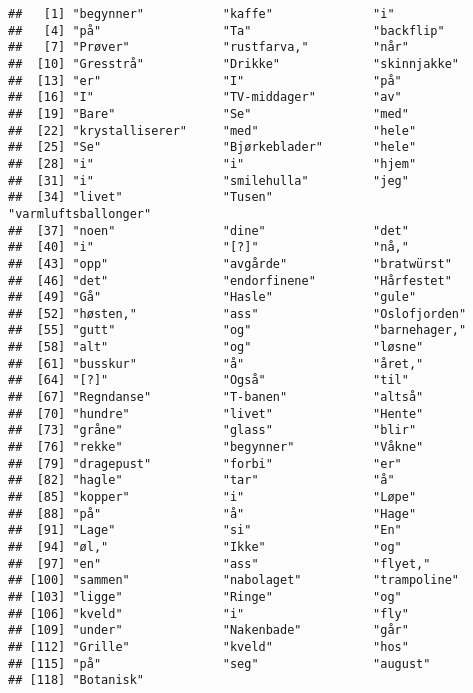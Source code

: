 \documentclass[
]{book}
\begin{document}
\begin{verbatim}
##   [1] "begynner"           "kaffe"              "i"                 
##   [4] "på"                 "Ta"                 "backflip"          
##   [7] "Prøver"             "rustfarva,"         "når"               
##  [10] "Gresstrå"           "Drikke"             "skinnjakke"        
##  [13] "er"                 "I"                  "på"                
##  [16] "I"                  "TV-middager"        "av"                
##  [19] "Bare"               "Se"                 "med"               
##  [22] "krystalliserer"     "mеd"                "hele"              
##  [25] "Se"                 "Bjørkeblader"       "hele"              
##  [28] "i"                  "i"                  "hjem"              
##  [31] "i"                  "smilehulla"         "jeg"               
##  [34] "livet"              "Tusen"              "varmluftsballonger"
##  [37] "noen"               "dine"               "det"               
##  [40] "i"                  "[?]"                "nå,"               
##  [43] "opp"                "avgårde"            "bratwürst"         
##  [46] "det"                "endorfinene"        "Hårfestet"         
##  [49] "Gå"                 "Hasle"              "gule"              
##  [52] "høsten,"            "ass"                "Oslofjorden"       
##  [55] "gutt"               "og"                 "barnehager,"       
##  [58] "alt"                "og"                 "løsne"             
##  [61] "busskur"            "å"                  "året,"             
##  [64] "[?]"                "Også"               "til"               
##  [67] "Regndanse"          "T-banen"            "altså"             
##  [70] "hundre"             "livet"              "Hente"             
##  [73] "gråne"              "glass"              "blir"              
##  [76] "rekke"              "begynner"           "Våkne"             
##  [79] "dragepust"          "forbi"              "er"                
##  [82] "hagle"              "tar"                "å"                 
##  [85] "koppеr"             "i"                  "Løpe"              
##  [88] "på"                 "å"                  "Hage"              
##  [91] "Lage"               "si"                 "En"                
##  [94] "øl,"                "Ikke"               "og"                
##  [97] "en"                 "ass"                "flyet,"            
## [100] "sammen"             "nabolaget"          "trampoline"        
## [103] "ligge"              "Ringe"              "og"                
## [106] "kveld"              "i"                  "fly"               
## [109] "under"              "Nakenbade"          "går"               
## [112] "Grille"             "kveld"              "hos"               
## [115] "på"                 "seg"                "august"            
## [118] "Botanisk"
\end{verbatim}
\end{document}
